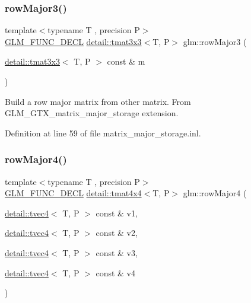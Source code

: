 \subsubsection{\texorpdfstring{row\+Major3()}{rowMajor3()}\hspace{0.1cm}{\footnotesize\ttfamily [2/2]}}
{\footnotesize\ttfamily template$<$typename T , precision P$>$ \\
\hyperlink{setup_8hpp_ab2d052de21a70539923e9bcbf6e83a51}{G\+L\+M\+\_\+\+F\+U\+N\+C\+\_\+\+D\+E\+CL} \hyperlink{structglm_1_1detail_1_1tmat3x3}{detail\+::tmat3x3}$<$T, P$>$ glm\+::row\+Major3 (\begin{DoxyParamCaption}\item[{\hyperlink{structglm_1_1detail_1_1tmat3x3}{detail\+::tmat3x3}$<$ T, P $>$ const \&}]{m }\end{DoxyParamCaption})}

Build a row major matrix from other matrix. From G\+L\+M\+\_\+\+G\+T\+X\+\_\+matrix\+\_\+major\+\_\+storage extension. 

Definition at line 59 of file matrix\+\_\+major\+\_\+storage.\+inl.

\mbox{\label{group__gtx__matrix__major__storage_gaba5dbb8fa29fcf57c80daf43ca7cf9db}} 
\subsubsection{\texorpdfstring{row\+Major4()}{rowMajor4()}\hspace{0.1cm}{\footnotesize\ttfamily [1/2]}}
{\footnotesize\ttfamily template$<$typename T , precision P$>$ \\
\hyperlink{setup_8hpp_ab2d052de21a70539923e9bcbf6e83a51}{G\+L\+M\+\_\+\+F\+U\+N\+C\+\_\+\+D\+E\+CL} \hyperlink{structglm_1_1detail_1_1tmat4x4}{detail\+::tmat4x4}$<$T, P$>$ glm\+::row\+Major4 (\begin{DoxyParamCaption}\item[{\hyperlink{structglm_1_1detail_1_1tvec4}{detail\+::tvec4}$<$ T, P $>$ const \&}]{v1,  }\item[{\hyperlink{structglm_1_1detail_1_1tvec4}{detail\+::tvec4}$<$ T, P $>$ const \&}]{v2,  }\item[{\hyperlink{structglm_1_1detail_1_1tvec4}{detail\+::tvec4}$<$ T, P $>$ const \&}]{v3,  }\item[{\hyperlink{structglm_1_1detail_1_1tvec4}{detail\+::tvec4}$<$ T, P $>$ const \&}]{v4 }\end{DoxyParamCaption})}

